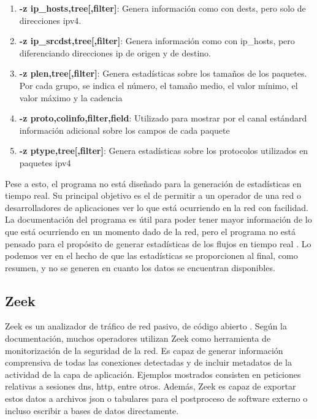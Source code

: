 \begin{enumerate}
    \item \textbf{-z ip\_hosts,tree[,filter]}: Genera información como con dests, pero solo de direcciones \acrshort{ipv4}.
    \item \textbf{-z ip\_srcdst,tree[,filter]}: Genera información como con ip\_hosts, pero diferenciando direcciones \acrshort{ip} de origen y de destino.
    \item \textbf{-z plen,tree[,filter]}: Genera estadísticas sobre los tamaños de los paquetes. Por cada grupo, se indica el número, el tamaño medio, el valor mínimo, el valor máximo y la cadencia
    \item \textbf{-z proto,colinfo,filter,field}: Utilizado para mostrar por el canal estándard información adicional sobre los campos de cada paquete
    \item \textbf{-z ptype,tree[,filter]}: Genera estadísticas sobre los protocolos utilizados en paquetes \acrshort{ipv4}
\end{enumerate}

Pese a esto, el programa no está diseñado para la generación de estadísticas en tiempo real. Su principal objetivo es el de permitir a un operador de una red o desarrolladores de aplicaciones ver lo que está ocurriendo en la red con facilidad. La documentación del programa es útil para poder tener mayor información de lo que está ocurriendo en un momento dado de la red, pero el programa no está pensado para el propósito de generar estadísticas de los flujos en tiempo real \cite{wiresharkrealtimestats}. Lo podemos ver en el hecho de que las estadísticas se proporcionen al final, como resumen, y no se generen en cuanto los datos se encuentran disponibles.

\subsection{Zeek}

Zeek es un analizador de tráfico de red pasivo, de código abierto \cite{zeek_documentation}. Según la documentación, muchos operadores utilizan Zeek como herramienta de monitorización de la seguridad de la red. Es capaz de generar información comprensiva de todas las conexiones detectadas y de incluir metadatos de la actividad de la capa de aplicación. Ejemplos mostrados consisten en peticiones relativas a sesiones \acrshort{dns}, \acrshort{http}, entre otros. Además, Zeek es capaz de exportar estos datos a archivos \acrshort{json} o tabulares para el postproceso de software externo o incluso escribir a bases de datos directamente. 

